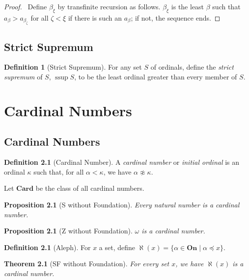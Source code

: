 \documentclass{book}
\let\qed\relax
\newtheorem{prop}[ax]{Proposition}
\newtheorem{thm}[ax]{Theorem}
\theoremstyle{definition}
\newtheorem{df}[ax]{Definition}
\newcommand{\ssup}{\ensuremath{\operatorname{ssup}}}
\begin{document}
\begin{proof}
\pf\ Define $\beta_\xi$ by transfinite recursion as follows. $\beta_\xi$ is the least $\beta$ such that $a_\beta > a_{\beta_\zeta}$ for all $\zeta < \xi$ if there is such an $a_\beta$; if not, the sequence ends.
\qed
\end{proof}

\section{Strict Supremum}

\begin{df}[Strict Supremum]
For any set $S$ of ordinals, define the \emph{strict supremum} of $S$, $\ssup S$, to be the least ordinal greater than every member of $S$.
\end{df}

\chapter{Cardinal Numbers}

\section{Cardinal Numbers}

\begin{df}[Cardinal Number]
A \emph{cardinal number} or \emph{initial ordinal} is an ordinal $\kappa$ such that, for all $\alpha < \kappa$, we have $\alpha \not\approx \kappa$.

Let $\mathbf{Card}$ be the class of all cardinal numbers.
\end{df}

\begin{prop}[S without Foundation]
Every natural number is a cardinal number.
\end{prop}

\begin{prop}[Z without Foundation]
$\omega$ is a cardinal number.
\end{prop}

\begin{df}[Aleph]
For $x$ a set, define $\aleph(x) = \{ \alpha \in \mathbf{On} \mid \alpha \preccurlyeq x \}$.
\end{df}

\begin{thm}[SF without Foundation]
For every set $x$, we have $\aleph(x)$ is a cardinal number.
\end{thm}
\end{document}
